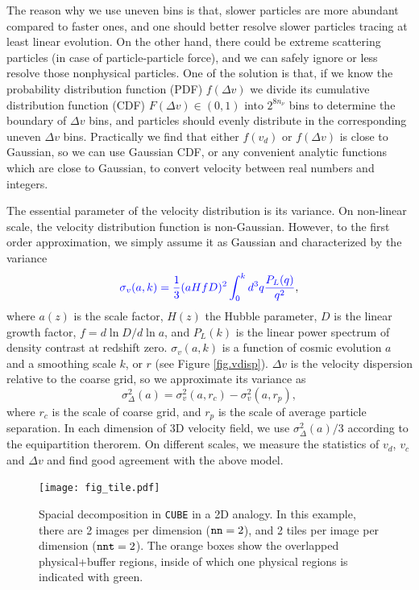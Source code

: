 \documentclass[10pt,twocolumn,preprint]{emulateapj}
\newcommand{\tcb}{\textcolor{blue}}
\begin{document}
The reason why we use uneven bins is that, slower particles are more 
abundant compared to faster ones, and one should better resolve slower 
particles tracing at least linear evolution. On the other hand, there could 
be extreme scattering particles (in case of particle-particle force), and we 
can safely ignore or less resolve those nonphysical particles. One of the 
solution is that, if we know the probability distribution function (PDF) 
$f(\Delta v)$ we divide its cumulative distribution function (CDF) $F(\Delta 
v)\in(0,1)$ into $2^{8n_\nu}$ bins to determine the boundary of $\Delta v$ 
bins, and particles should evenly distribute in the corresponding uneven $
\Delta v$ bins. Practically we find that either $f(v_d)$ or $f(\Delta v)$ is 
close to Gaussian, so we can use Gaussian CDF, or any convenient analytic 
functions which are close to Gaussian, to convert velocity between real 
numbers and integers.

The essential parameter of the velocity distribution is its variance. On 
non-linear scale, the velocity distribution function is non-Gaussian. 
However, to the first order approximation, we simply assume it as Gaussian 
and characterized by the variance
\begin{equation}\label{eq.vdisp}
	\tcb{ \sigma_v(a,k) = \frac{1}{3}  (a H f D)^2 \int_0^kd^3q\frac{P_{L}(q)}{q^2}},
\end{equation}
where $a(z)$ is the scale factor, $H(z)$ the Hubble parameter, $D$ is the 
linear growth factor, $f=d \ln D/d\ln a$, and $P_L(k)$ is the linear power 
spectrum of density contrast at redshift zero.
$\sigma_v(a,k)$ is a function of cosmic evolution $a$ and a smoothing scale 
$k$, or $r$ (see Figure \ref{fig.vdisp}). $\Delta v$
is the velocity dispersion relative to the coarse grid, so we approximate 
its variance as
\begin{equation}\label{eq.vdelta}
	\sigma^2_{\Delta}(a)=\sigma^2_v(a,r_c)-\sigma^2_v(a,r_p), 
\end{equation}
where $r_c$ is the scale of
coarse grid, and $r_p$ is the scale of average particle separation. In each
dimension of 3D velocity field, we use $\sigma^2_{\Delta}(a)/3$ according 
to the equipartition therorem. On different scales, we measure the 
statistics of $v_d$, $v_c$ and $\Delta v$ and find good agreement with the 
above model.

\begin{figure}
\centering
  \texttt{[image: fig\_tile.pdf]}
 \caption{Spacial decomposition in {\tt CUBE} in a 2D analogy. In this example, there are 2 images per dimension (${\tt nn}=2$), and 2 tiles per image per dimension (${\tt nnt}=2$). The orange boxes show the overlapped physical+buffer regions, inside of which one physical regions is indicated with green.}
\label{fig.tile}
\end{figure}
\end{document}
